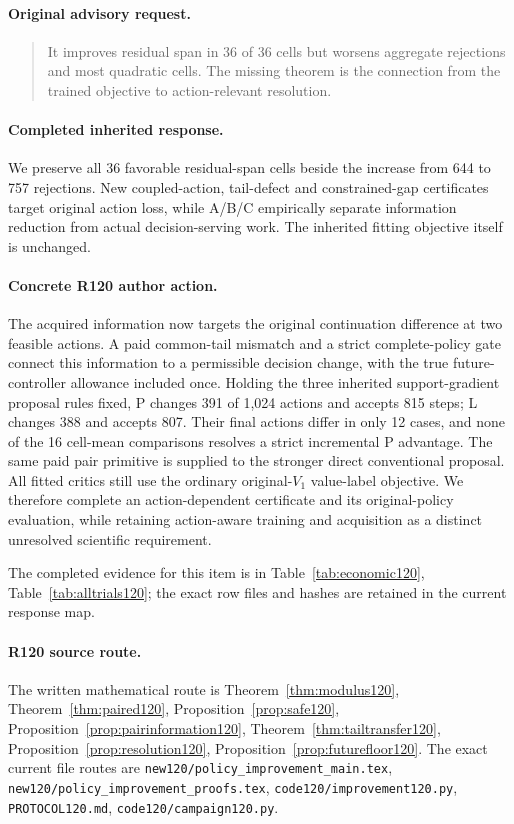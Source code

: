 \paragraph{Original advisory request.}
\begin{quote}
It improves residual span in 36 of 36 cells but worsens aggregate rejections and most quadratic cells. The missing theorem is the connection from the trained objective to action-relevant resolution.
\end{quote}
\paragraph{Completed inherited response.}
We preserve all 36 favorable residual-span cells beside the increase from 644 to 757 rejections. New coupled-action, tail-defect and constrained-gap certificates target original action loss, while A/B/C empirically separate information reduction from actual decision-serving work. The inherited fitting objective itself is unchanged.
\paragraph{Concrete R120 author action.}
The acquired information now targets the original continuation difference at two feasible actions. A paid common-tail mismatch and a strict complete-policy gate connect this information to a permissible decision change, with the true future-controller allowance included once. Holding the three inherited support-gradient proposal rules fixed, P changes 391 of 1,024 actions and accepts 815 steps; L changes 388 and accepts 807. Their final actions differ in only 12 cases, and none of the 16 cell-mean comparisons resolves a strict incremental P advantage. The same paid pair primitive is supplied to the stronger direct conventional proposal. All fitted critics still use the ordinary original-$V_1$ value-label objective. We therefore complete an action-dependent certificate and its original-policy evaluation, while retaining action-aware training and acquisition as a distinct unresolved scientific requirement.

The completed evidence for this item is in Table~\ref{tab:economic120}, Table~\ref{tab:alltrials120}; the exact row files and hashes are retained in the current response map.
\paragraph{R120 source route.}
The written mathematical route is Theorem~\ref{thm:modulus120}, Theorem~\ref{thm:paired120}, Proposition~\ref{prop:safe120}, Proposition~\ref{prop:pairinformation120}, Theorem~\ref{thm:tailtransfer120}, Proposition~\ref{prop:resolution120}, Proposition~\ref{prop:futurefloor120}. The exact current file routes are \nolinkurl{new120/policy_improvement_main.tex}, \nolinkurl{new120/policy_improvement_proofs.tex}, \nolinkurl{code120/improvement120.py}, \nolinkurl{PROTOCOL120.md}, \nolinkurl{code120/campaign120.py}.
